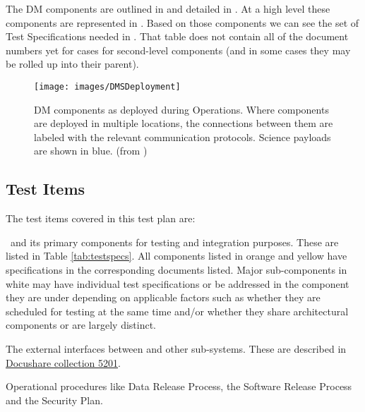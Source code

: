  The DM components are  outlined in  and detailed in . At a high level these components are represented in .  Based on those components we can see the set of Test Specifications needed in . That table does not contain all of the document numbers yet for cases for second-level components (and in some cases they may be rolled up into their parent).


\begin{figure}[htbp]
	\begin{center}
		\texttt{[image: images/DMSDeployment]}
		\caption{DM components as deployed during Operations. Where components are
			deployed in multiple locations, the connections between them are labeled with
			the relevant communication protocols. Science payloads are shown in blue.
		\label{fig:dmsdeploy} (from )}
	\end{center}
\end{figure}

\subsection{Test Items}

\begin{table}
	\caption{Components from LDM-148 with the test specifications to verify them. \label{tab:testspecs}}
	
\end{table}

The test items covered in this test plan are:

\begin{itemize_single}
\item \product\ and its primary components for testing and integration purposes. These are listed in Table \ref{tab:testspecs}. All components listed in orange and yellow have specifications in the corresponding documents listed. Major sub-components in white may have individual test specifications or be addressed in the component they are under depending on applicable factors such as whether they are scheduled for testing at the same time and/or whether they share architectural components or are largely distinct.

\item The external interfaces between \product and other sub-systems. These are described in \href{https://ls.st/Collection-5201}{Docushare collection 5201}.

\item Operational procedures like Data Release Process, the Software Release Process and the Security Plan.

\end{itemize_single}


